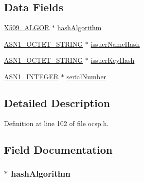 \subsection*{Data Fields}
\begin{DoxyCompactItemize}
\item 
\hyperlink{crypto_2ossl__typ_8h_aa2b6185e6254f36f709cd6577fb5022e}{X509\+\_\+\+A\+L\+G\+OR} $\ast$ \hyperlink{structocsp__cert__id__st_a8ce216d7fda96e3d0c13d36ba437b55a}{hash\+Algorithm}
\item 
\hyperlink{crypto_2ossl__typ_8h_afbd05e94e0f0430a2b729473efec88c1}{A\+S\+N1\+\_\+\+O\+C\+T\+E\+T\+\_\+\+S\+T\+R\+I\+NG} $\ast$ \hyperlink{structocsp__cert__id__st_a104ad82020e11e66fc05a8d468c809c9}{issuer\+Name\+Hash}
\item 
\hyperlink{crypto_2ossl__typ_8h_afbd05e94e0f0430a2b729473efec88c1}{A\+S\+N1\+\_\+\+O\+C\+T\+E\+T\+\_\+\+S\+T\+R\+I\+NG} $\ast$ \hyperlink{structocsp__cert__id__st_ab16432e80c2afe5f2d007d6d888721cc}{issuer\+Key\+Hash}
\item 
\hyperlink{crypto_2ossl__typ_8h_af4335399bf9774cb410a5e93de65998b}{A\+S\+N1\+\_\+\+I\+N\+T\+E\+G\+ER} $\ast$ \hyperlink{structocsp__cert__id__st_a957a5fd70cdff1e46a8df4d4bac22348}{serial\+Number}
\end{DoxyCompactItemize}


\subsection{Detailed Description}


Definition at line 102 of file ocsp.\+h.



\subsection{Field Documentation}
\subsubsection[{\texorpdfstring{hash\+Algorithm}{hashAlgorithm}}]{ $\ast$ hash\+Algorithm}\hypertarget{structocsp__cert__id__st_a8ce216d7fda96e3d0c13d36ba437b55a}{}\label{structocsp__cert__id__st_a8ce216d7fda96e3d0c13d36ba437b55a}


